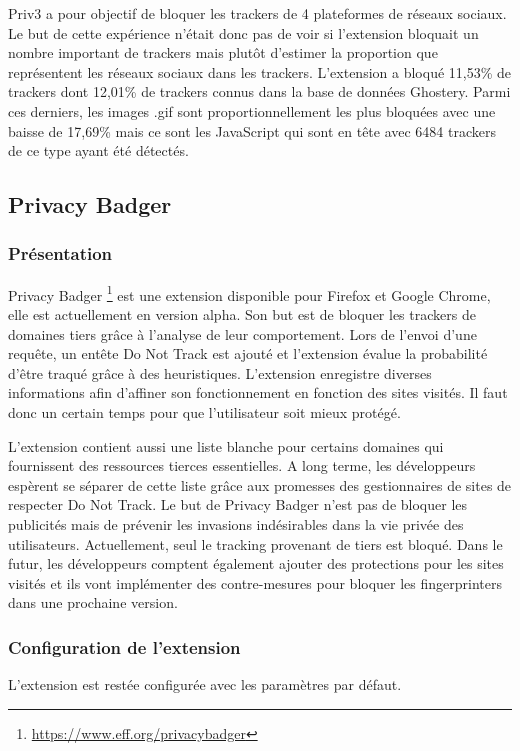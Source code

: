 Priv3 a pour objectif de bloquer les trackers de 4 plateformes de réseaux sociaux. Le but de cette expérience n'était donc pas de voir si l'extension bloquait un nombre important de trackers mais plutôt d'estimer la proportion que représentent les réseaux sociaux dans les trackers. L'extension a bloqué 11,53\% de trackers dont 12,01\% de trackers connus dans la base de données Ghostery. Parmi ces derniers, les images .gif sont proportionnellement les plus bloquées avec une baisse de 17,69\% mais ce sont les JavaScript qui sont en tête avec 6484 trackers de ce type ayant été détectés.


\subsection{Privacy Badger}
\subsubsection{Présentation}
Privacy Badger \footnote{\url{https://www.eff.org/privacybadger}} est une extension disponible pour Firefox et Google Chrome, elle est actuellement en version alpha. Son but est de bloquer les trackers de domaines tiers grâce à l'analyse de leur comportement. 
Lors de l'envoi d'une requête, un entête Do Not Track est ajouté et l'extension évalue la probabilité d'être traqué grâce à des heuristiques. L'extension enregistre diverses informations afin d'affiner son fonctionnement en fonction des sites visités. Il faut donc un certain temps pour que l'utilisateur soit mieux protégé.

L'extension contient aussi une liste blanche pour certains domaines qui fournissent des ressources tierces essentielles. A long terme, les développeurs espèrent se séparer de cette liste grâce aux promesses des gestionnaires de sites de respecter Do Not Track. Le but de Privacy Badger n'est pas de bloquer les publicités mais de prévenir les invasions indésirables dans la vie privée des utilisateurs. 
Actuellement, seul le tracking provenant de tiers est bloqué. Dans le futur, les développeurs comptent également ajouter des protections pour les sites visités et ils vont implémenter des contre-mesures pour bloquer les fingerprinters dans une prochaine version.

\subsubsection{Configuration de l'extension}
L'extension est restée configurée avec les paramètres par défaut.

